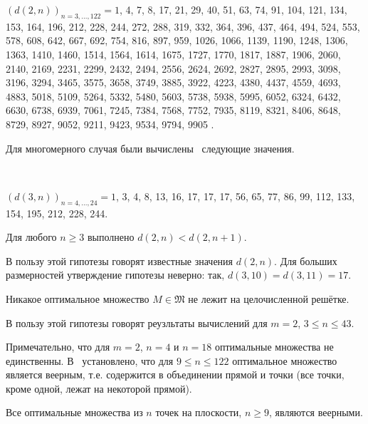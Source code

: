 \begin{proposition}
\label{proposition:d(2,n)}
\end{proposition}
$(d(2, n))_{n=3,...,122} = 1$, 4, 7, 8, 17, 21, 29, 40, 51, 63, 74, 91, 104, 121,
134, 153, 164,
196, 212, 228, 244, 272, 288, 319, 332, 364, 396, 437, 464, 494, 524, 553, 578, 608,
642, 667, 692, 754, 816, 897, 959, 1026, 1066, 1139, 1190,  1248, 1306, 1363, 1410,
1460, 1514, 1564, 1614, 1675, 1727, 1770, 1817, 1887, 1906, 2060, 2140, 2169,
2231, 2299, 2432, 2494, 2556, 2624, 2692, 2827, 2895, 2993, 3098, 3196, 3294,
3465, 3575, 3658, 3749, 3885, 3922, 4223, 4380, 4437, 4559, 4693, 4883,
5018, 5109, 5264, 5332, 5480, 5603, 5738, 5938, 5995, 6052,
6324, 6432, 6630, 6738, 6939, 7061, 7245, 7384, 7568, 7752, 7935, 8119, 8321,
8406, 8648, 8729, 8927, 9052, 9211, 9423, 9534, 9794, 9905
.

Для многомерного случая были вычислены~\cite{piepmeyer1988raumliche,harborth1998integral,kurz2005characteristic,kurz2006konstruktion,kurz2008bounds} следующие значения.
\begin{proposition}~
\end{proposition}
$(d(3, n))_{n=4,...,24} = 1$, 3, 4, 8, 13, 16, 17, 17, 17, 56, 65, 77, 86, 99, 112, 133, 154,
195, 212, 228, 244.

\begin{hypothesis}
	Для любого $n\geq 3$ выполнено $d(2,n) < d(2,n+1)$.
\end{hypothesis}
В пользу этой гипотезы говорят известные значения $d(2,n)$.
Для больших размерностей утверждение гипотезы неверно: так, $d(3,10) = d(3,11) = 17$.

\begin{hypothesis}
	Никакое оптимальное множество $M\in\mathfrak{M}$ не лежит на целочисленной решётке.
\end{hypothesis}
В пользу этой гипотезы говорят реузльтаты вычислений для $m=2$, $3 \leq n \leq 43$.

Примечательно, что для $m=2$, $n=4$ и $n=18$ оптимальные множества не единственны.
В~\cite{kurz2008bounds} установлено, что для $9 \leq n \leq 122$ оптимальное множество является веерным, т.е. содержится
в объединении прямой и точки (все точки, кроме одной, лежат на некоторой прямой).

\begin{hypothesis}
	Все оптимальные множества из $n$ точек на плоскости, $n\geq 9$, являются веерными.
\end{hypothesis}




